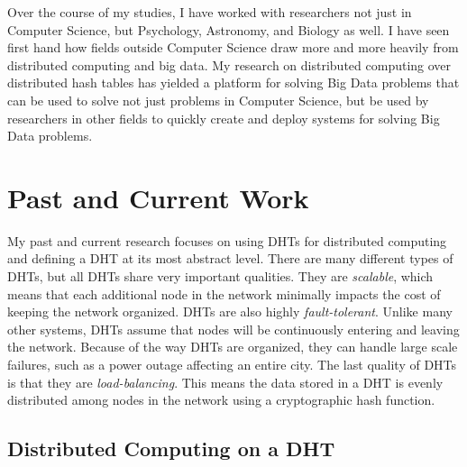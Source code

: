 \documentclass[letterpaper]{article}
\begin{document}
Over the course of my studies, I have worked with researchers not just in Computer Science, but Psychology, Astronomy, and Biology as well.
I have seen first hand how fields outside Computer Science draw more and more heavily from distributed computing and big data.
My research on distributed computing over distributed hash tables has yielded a platform for solving Big Data problems that can be used to solve not just problems in Computer Science, but be used by researchers in other fields to quickly create and deploy systems for solving Big Data problems.

%
%

%
%
%

\section{Past and Current Work}

My past and current research focuses on using DHTs for distributed computing \cite{chordreduce} and defining a DHT at its most abstract level.
There are many different types of DHTs, but all DHTs share very important qualities.
They are \textit{scalable}, which means that each additional node in the network minimally impacts the cost of keeping the network organized.
DHTs are also highly \textit{fault-tolerant}.
Unlike many other systems, DHTs assume that nodes will be continuously entering and leaving the network.
Because of the way DHTs are organized, they can handle large scale failures, such as a power outage affecting an entire city.
The last quality of DHTs is that they are \textit{load-balancing}. 
This means the data stored in a DHT is evenly distributed among nodes in the network using a cryptographic hash function.


\subsection{Distributed Computing on a DHT}
\end{document}
